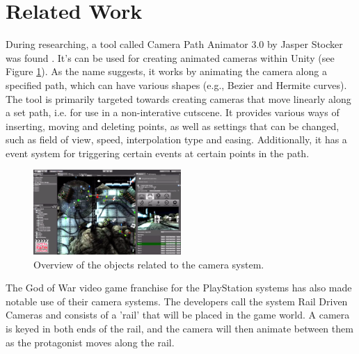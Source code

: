 \section{Related Work}\label{relatedWork}

During researching, a tool called Camera Path Animator 3.0 by Jasper Stocker was found \cite{unity_camTool}. It's can be used for creating animated cameras within Unity (see Figure \ref{fig:unity_path_cam_tool}). As the name suggests, it works by animating the camera along a specified path, which can have various shapes (e.g., Bezier and Hermite curves). The tool is primarily targeted towards creating cameras that move linearly along a set path, i.e. for use in a non-interative cutscene. It provides various ways of inserting, moving and deleting points, as well as settings that can be changed, such as field of view, speed, interpolation type and easing. Additionally, it has a event system for triggering certain events at certain points in the path.

\begin{figure}[htbp]
\centering
\includegraphics[width=0.50\textwidth]{Pics/unity_path_cam_tool}
\caption{Overview of the objects related to the camera system.}
\label{fig:unity_path_cam_tool}
\end{figure}

The God of War video game franchise for the PlayStation systems has also made notable use of their camera systems. The developers call the system Rail Driven Cameras and consists of a 'rail' that will be placed in the game world. A camera is keyed in both ends of the rail, and the camera will then animate between them as the protagonist moves along the rail. %